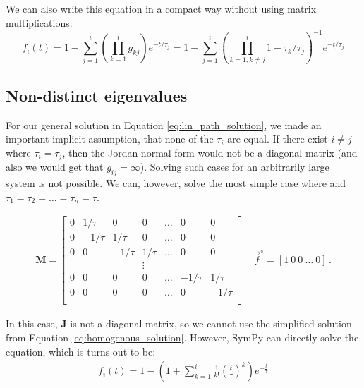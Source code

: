 \documentclass{article}
\newcommand{\finit}{\ensuremath{\vec{f}^\circ}}
\begin{document}
We can also write this equation in a compact way without using matrix multiplications:
\begin{equation}
f_i(t) = 
1 - \sum_{j=1}^{i} \left(\prod_{k=1}^{i} g_{kj}\right) e^{- t/\tau_j} = 
1 - \sum_{j=1}^{i} \left(\prod_{k = 1, k \neq j}^{i} 1 - \tau_k/\tau_j\right)^{-1} e^{- t/\tau_j}
\end{equation}

\subsection{Non-distinct eigenvalues}\label{sec:equal_taus}
For our general solution in Equation \ref{eq:lin_path_solution}, we made an important implicit assumption, that none of the $\tau_i$ are equal. If there exist $i \neq j$ where $\tau_i = \tau_j$, then the Jordan normal form would not be a diagonal matrix (and also we would get that $g_{ij} = \infty$). Solving such cases for an arbitrarily large system is not possible. We can, however, solve the most simple case where and $\tau_1 = \tau_2 = \ldots = \tau_n = \tau$.

\begin{eqnarray}
\mathbf{M} =
\begin{bmatrix}
0 & 1/\tau & 0 & 0 & \ldots & 0 & 0\\
0 & -1/\tau & 1/\tau & 0 & \ldots & 0 & 0\\
0 & 0 & -1/\tau & 1/\tau & \ldots & 0 & 0\\
& & & \vdots & & &\\
0 & 0 & 0 & 0 & \ldots & -1/\tau & 1/\tau\\
0 & 0 & 0 & 0 & \ldots & 0 & -1/\tau \\
\end{bmatrix}
~~~~~
\finit = \left[1~0~0~\ldots~0\right]\,.
\end{eqnarray}

In this case, $\mathbf{J}$ is not a diagonal matrix, so we cannot use the simplified solution from Equation \ref{eq:homogenous_solution}. However, SymPy can directly solve the equation, which is turns out to be:
\begin{eqnarray}\label{eq:equal_tau_solution}
    f_i(t) = 1 - \left(1 + \sum_{k=1}^i \frac{1}{k!}\left(\frac{t}{\tau}\right)^k \right) e^{-\frac{t}{\tau}}
\end{eqnarray}
\end{document}
